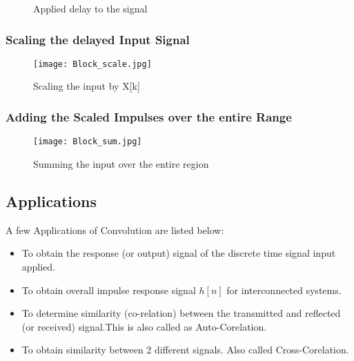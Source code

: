 \begin{figure}[ht]
\centering
{}
\caption{\label{Step 2:} Applied delay to the signal}
\end{figure}
\pagebreak



\subsubsection{Scaling the delayed Input Signal}

\begin{figure}[ht]
\centering
\texttt{[image: Block\_scale.jpg]}
\caption{\label{Step 3:} Scaling the input by X[k]}
\end{figure}

\subsubsection{Adding the Scaled Impulses over the entire Range}

\begin{figure}[ht]
\centering
\texttt{[image: Block\_sum.jpg]}
\caption{\label{Step 4:} Summing the input over the entire region}
\end{figure}


\subsection{Applications}
A few Applications of Convolution are listed below:
\begin{itemize}
\item To obtain the response (or output) signal of the discrete time signal input applied.
\item To obtain overall impulse response signal $h[n]$ for interconnected systems.
\item To determine similarity (co-relation) between the transmitted and reflected (or received) signal.This is also called as Auto-Corelation.
\item To obtain similarity between 2 different signals. Also called Cross-Corelation. 
\end{itemize}


